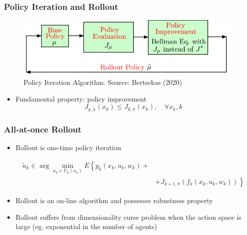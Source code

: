 \documentclass{beamer}
\begin{document}
    \begin{frame}
	\frametitle{Policy Iteration and Rollout}
	
    \begin{figure}
		\includegraphics[scale=0.65]{2a_pi}
		\caption{Policy Iteration Algorithm. Source: Bertsekas (2020)}
	\end{figure}
	
	
	\begin{itemize}
		\item Fundamental property: policy improvement
		$$J_{k, \tilde{\pi}}\left(x_{k}\right) \leq J_{k, \pi}\left(x_{k}\right), \quad \forall x_{k}, k$$
		
	\end{itemize}
	
	\end{frame}




\begin{frame}
	\frametitle{All-at-once Rollout}
	
	\begin{itemize}
		\item Rollout is one-time policy iteration

$$
\begin{aligned}
\tilde{u}_{k} \in \arg \min _{u_{k} \in U_{k}\left(x_{k}\right)} E\left\{g_{k}\left(x_{k}, u_{k}, w_{k}\right) + \right.\\
&\left.+J_{k+1, \pi}\left(f_{k}\left(x_{k}, u_{k}, w_{k}\right)\right)\right\}
\end{aligned}
$$

		\item Rollout is an on-line algorithm and possesses robustness property 
		\item Rollout suffers from dimensionality curse problem when 
		the action space is large (eg. exponential in the number of agents)
		
	\end{itemize}
	
\end{frame}

\end{document}
